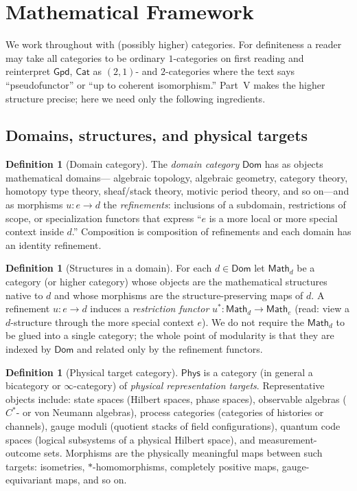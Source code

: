 \documentclass[12pt]{article}
\theoremstyle{definition}
\newtheorem{definition}[theorem]{Definition}
\theoremstyle{remark}
\newcommand{\Dom}{\mathsf{Dom}}
\newcommand{\Math}{\mathsf{Math}}
\newcommand{\Phys}{\mathsf{Phys}}
\newcommand{\Gpd}{\mathsf{Gpd}}
\newcommand{\Cat}{\mathsf{Cat}}
\begin{document}
\section{Mathematical Framework}
\label{sec:framework}

We work throughout with (possibly higher) categories. For definiteness a reader
may take all categories to be ordinary $1$-categories on first reading and
reinterpret $\Gpd$, $\Cat$ as $(2,1)$- and $2$-categories where the text says
``pseudofunctor'' or ``up to coherent isomorphism.'' Part~V makes the higher
structure precise; here we need only the following ingredients.

\subsection{Domains, structures, and physical targets}

\begin{definition}[Domain category]
\label{def:dom}
The \emph{domain category} $\Dom$ has as objects mathematical domains---%
algebraic topology, algebraic geometry, category theory, homotopy type theory,
sheaf/stack theory, motivic period theory, and so on---and as morphisms
$u : e \to d$ the \emph{refinements}: inclusions of a subdomain, restrictions of
scope, or specialization functors that express ``$e$ is a more local or more
special context inside $d$.'' Composition is composition of refinements and each
domain has an identity refinement.
\end{definition}

\begin{definition}[Structures in a domain]
\label{def:mathd}
For each $d \in \Dom$ let $\Math_d$ be a category (or higher category) whose
objects are the mathematical structures native to $d$ and whose morphisms are
the structure-preserving maps of $d$. A refinement $u : e \to d$ induces a
\emph{restriction functor} $u^\ast : \Math_d \to \Math_e$ (read: view a
$d$-structure through the more special context $e$). We do not require the
$\Math_d$ to be glued into a single category; the whole point of modularity is
that they are indexed by $\Dom$ and related only by the refinement functors.
\end{definition}

\begin{definition}[Physical target category]
\label{def:phys}
$\Phys$ is a category (in general a bicategory or $\infty$-category) of
\emph{physical representation targets}. Representative objects include:
state spaces (Hilbert spaces, phase spaces), observable algebras
($C^\ast$- or von Neumann algebras), process categories (categories of
histories or channels), gauge moduli (quotient stacks of field configurations),
quantum code spaces (logical subsystems of a physical Hilbert space), and
measurement-outcome sets. Morphisms are the physically meaningful maps between
such targets: isometries, $\ast$-homomorphisms, completely positive maps,
gauge-equivariant maps, and so on.
\end{definition}
\end{document}
